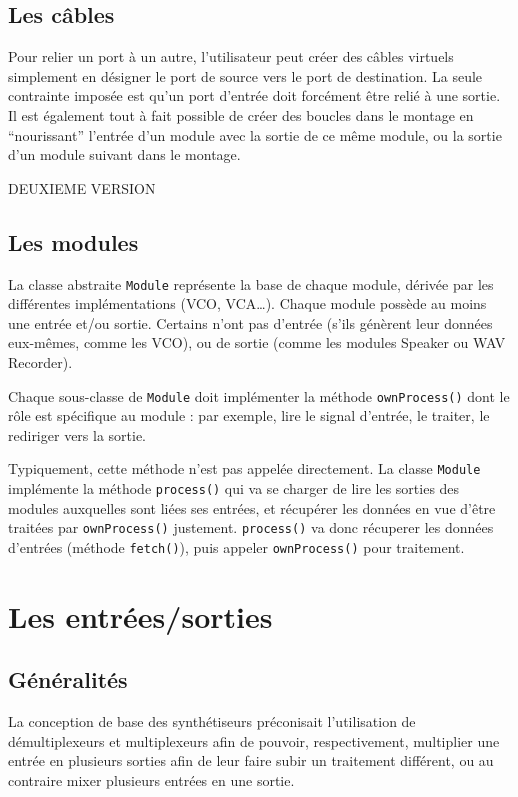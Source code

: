 \subsection{Les câbles}

Pour relier un port à un autre, l'utilisateur peut créer des câbles
virtuels simplement en désigner le port de source vers le port de
destination. La seule contrainte imposée est qu'un port d'entrée
doit forcément être relié à une sortie. Il est également tout à
fait possible de créer des boucles dans le montage en
``nourissant'' l'entrée d'un module avec la sortie de ce même
module, ou la sortie d'un module suivant dans le montage.

\Huge{DEUXIEME VERSION}\normalsize\\
\subsection{Les modules}

La classe abstraite \verb!Module! représente la base de chaque
module, dérivée par les différentes implémentations (VCO,
VCA\ldots{}). Chaque module possède au moins une entrée et/ou
sortie. Certains n'ont pas d'entrée (s'ils génèrent leur données
eux-mêmes, comme les VCO), ou de sortie (comme les modules Speaker
ou WAV Recorder).

Chaque sous-classe de \verb!Module! doit implémenter la méthode
\verb!ownProcess()! dont le rôle est spécifique au module : par
exemple, lire le signal d'entrée, le traiter, le rediriger vers la
sortie.

Typiquement, cette méthode n'est pas appelée directement. La classe
\verb!Module! implémente la méthode \verb!process()! qui va se
charger de lire les sorties des modules auxquelles sont liées ses
entrées, et récupérer les données en vue d'être traitées par
\verb!ownProcess()! justement. \verb!process()! va donc récuperer
les données d'entrées (méthode \verb!fetch()!), puis appeler
\verb!ownProcess()! pour traitement.

\section{Les entrées/sorties}

\subsection{Généralités}

La conception de base des synthétiseurs préconisait l'utilisation
de démultiplexeurs et multiplexeurs afin de pouvoir,
respectivement, multiplier une entrée en plusieurs sorties afin de
leur faire subir un traitement différent, ou au contraire mixer
plusieurs entrées en une sortie.

